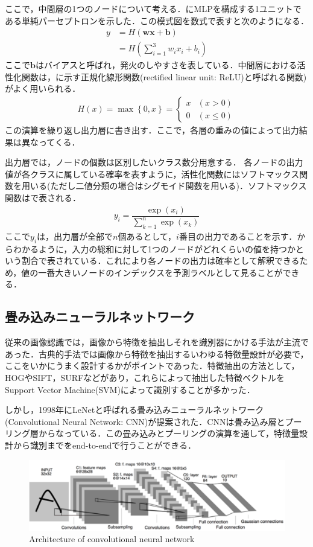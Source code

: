 ここで，中間層の1つのノードについて考える．にMLPを構成する1ユニットである単純パーセプトロンを示した．この模式図を数式で表すと次のようになる．
\begin{align}
	y & = H(\bm{w}\bm{x} + \bm{b}) \\
	& = H\left( \sum_{i=1}^3 w_i x_i + b_i \right) 
\end{align}
ここで$\bm{b}$はバイアスと呼ばれ，発火のしやすさを表している．中間層における活性化関数は，に示す正規化線形関数(rectified linear unit: ReLU)と呼ばれる関数)がよく用いられる．
\begin{align}\label{eq:ReLU}
	H(x) = \max \left\lbrace 0, x \right\rbrace = \begin{cases}
	x & (x > 0) \\
	0 & (x \leq 0)
	\end{cases}
\end{align}
この演算を繰り返し出力層に書き出す．ここで，各層の重みの値によって出力結果は異なってくる．

出力層では，ノードの個数は区別したいクラス数分用意する．
各ノードの出力値が各クラスに属している確率を表すように，活性化関数にはソフトマックス関数を用いる(ただし二値分類の場合はシグモイド関数を用いる)．ソフトマックス関数はで表される．
\begin{align}\label{eq:softmax}
	y_i = \dfrac{\exp(x_i)}{\displaystyle　\sum_{k=1}^n \exp(x_k)}
\end{align}
ここで$y_i$は，出力層が全部で$n$個あるとして，$i$番目の出力であることを示す．からわかるように，入力の総和に対して1つのノードがどれくらいの値を持つかという割合で表されている．これにより各ノードの出力は確率として解釈できるため，値の一番大きいノードのインデックスを予測ラベルとして見ることができる．


\subsection{畳み込みニューラルネットワーク}
従来の画像認識では，画像から特徴を抽出しそれを識別器にかける手法が主流であった．古典的手法では画像から特徴を抽出するいわゆる特徴量設計が必要で，ここをいかにうまく設計するかがポイントであった．特徴抽出の方法として，HOG\cite{HOG}やSIFT\cite{SIFT}，SURF\cite{SURF}などがあり，これらによって抽出した特徴ベクトルをSupport Vector Machine(SVM)\cite{SVM}によって識別することが多かった．

しかし，1998年にLeNetと呼ばれる畳み込みニューラルネットワーク(Convolutional Neural Network: CNN)が提案された\cite{LeNet}．CNNは畳み込み層とプーリング層からなっている．この畳み込みとプーリングの演算を通して，特徴量設計から識別までをend-to-endで行うことができる．
\begin{figure}[H]
	\centering
	\includegraphics[width=0.7\linewidth]{fig/LeNet}
	\caption{Architecture of convolutional neural network\cite{LeNet}}
	\label{fig:LeNet}
\end{figure}


